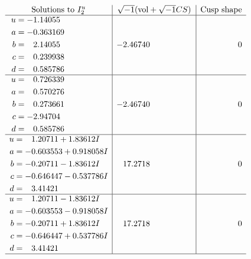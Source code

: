 \documentclass[1p]{elsarticle_modified}
\theoremstyle{definition}
\newcommand{\I}{\sqrt{-1}}
\begin{document}
$$\begin{array}{c|c|c}  
\text{Solutions to }I^u_{2}& \I (\text{vol} + \sqrt{-1}CS) & \text{Cusp shape}\\
 \hline 
\begin{aligned}
u &= -1.14055\phantom{ +0.000000I} \\
a &= -0.363169\phantom{ +0.000000I} \\
b &= \phantom{-}2.14055\phantom{ +0.000000I} \\
c &= \phantom{-}0.239938\phantom{ +0.000000I} \\
d &= \phantom{-}0.585786\phantom{ +0.000000I}\end{aligned}
 & -2.46740\phantom{ +0.000000I} & \phantom{-0.000000 } 0 \\ \hline\begin{aligned}
u &= \phantom{-}0.726339\phantom{ +0.000000I} \\
a &= \phantom{-}0.570276\phantom{ +0.000000I} \\
b &= \phantom{-}0.273661\phantom{ +0.000000I} \\
c &= -2.94704\phantom{ +0.000000I} \\
d &= \phantom{-}0.585786\phantom{ +0.000000I}\end{aligned}
 & -2.46740\phantom{ +0.000000I} & \phantom{-0.000000 } 0 \\ \hline\begin{aligned}
u &= \phantom{-}1.20711 + 1.83612 I \\
a &= -0.603553 + 0.918058 I \\
b &= -0.20711 - 1.83612 I \\
c &= -0.646447 - 0.537786 I \\
d &= \phantom{-}3.41421\phantom{ +0.000000I}\end{aligned}
 & \phantom{-}17.2718\phantom{ +0.000000I} & \phantom{-0.000000 } 0 \\ \hline\begin{aligned}
u &= \phantom{-}1.20711 - 1.83612 I \\
a &= -0.603553 - 0.918058 I \\
b &= -0.20711 + 1.83612 I \\
c &= -0.646447 + 0.537786 I \\
d &= \phantom{-}3.41421\phantom{ +0.000000I}\end{aligned}
 & \phantom{-}17.2718\phantom{ +0.000000I} & \phantom{-0.000000 } 0\\
 \hline 
 \end{array}$$\newpage\newpage\renewcommand{\arraystretch}{1}
\end{document}

